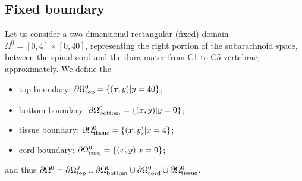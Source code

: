 \documentclass[a4paper,11pt,oneside]{book}
\begin{document}
\subsection{Fixed boundary}
Let us consider a two-dimensional rectangular (fixed) domain $\Omega^0 = [0, 4]
\times [0, 40]$, representing the right portion of the subarachnoid space, between the spinal cord and the dura mater from C1 to C5 vertebrae, approximately. We define the
\begin{itemize}
\item
  top boundary: $\partial \Omega_{\rm top}^0 = \{ (x, y) | y = 40\}$;
\item
  bottom boundary: $\partial \Omega_{\rm bottom}^0 = \{ (x, y) | y = 0\}$;
\item
  tissue boundary: $\partial \Omega_{\rm tissue}^0 = \{ (x, y) | x = 4\}$;
\item
  cord boundary: $\partial \Omega_{\rm cord}^0 = \{ (x, y) | x = 0\}$;
\end{itemize}
and thus $\partial \Omega^0 = \partial \Omega_{\rm top}^0 \cup
\partial \Omega_{\rm bottom}^0 \cup \partial \Omega_{\rm cord}^0 \cup
\partial \Omega_{\rm tissue}^0$.
\end{document}
